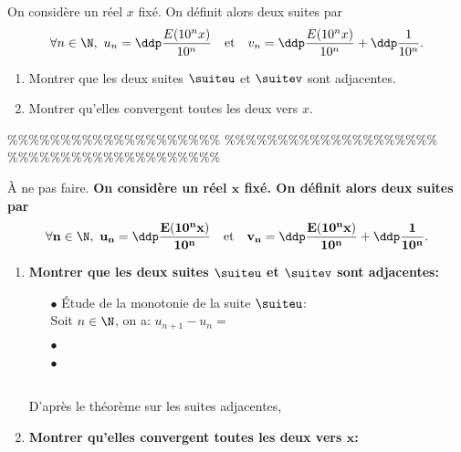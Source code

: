 


\begin{exercice}
On consid\`{e}re un r\'eel $x$ fix\'e. On d\'efinit alors deux suites par
$$\forall n\in\N,\ u_n=\ddp\frac{E(10^n x)}{10^n}\quad \hbox{et}\quad v_n=\ddp\frac{E(10^n x)}{10^n}+\ddp\frac{1}{10^n}.$$
\begin{enumerate}
\item Montrer que les deux suites $\suiteu$ et $\suitev$ sont adjacentes.
\item Montrer qu'elles convergent toutes les deux vers $x$.
\end{enumerate}
\end{exercice}





\%\%\%\%\%\%\%\%\%\%\%\%\%\%\%\%\%\%\%\%
\%\%\%\%\%\%\%\%\%\%\%\%\%\%\%\%\%\%\%\%
\%\%\%\%\%\%\%\%\%\%\%\%\%\%\%\%\%\%\%\%



\begin{correction}
\`{A} ne pas faire.
\textbf{On consid\`{e}re un r\'eel $\mathbf{x}$ fix\'e. On d\'efinit alors deux suites par}
$$\mathbf{\forall n\in\N,\ u_n=\ddp\frac{E(10^n x)}{10^n}\quad \hbox{et}\quad v_n=\ddp\frac{E(10^n x)}{10^n}+\ddp\frac{1}{10^n}.}$$
\begin{enumerate}
\item \textbf{Montrer que les deux suites $\mathbf{\suiteu}$ et $\mathbf{\suitev}$ sont adjacentes:}
\begin{itemize}
\item[$\bullet$] \'Etude de la monotonie de la suite $\suiteu$:\\
\noindent Soit $n\in\N$, on a: $u_{n+1}-u_n=$

\item[$\bullet$]
\item[$\bullet$]
\end{itemize}
\\
\noindent D'apr\`{e}s le th\'eor\`{e}me sur les suites adjacentes, 
\item \textbf{Montrer qu'elles convergent toutes les deux vers $\mathbf{x}$:}\\
\noindent 
\end{enumerate}
\end{correction}